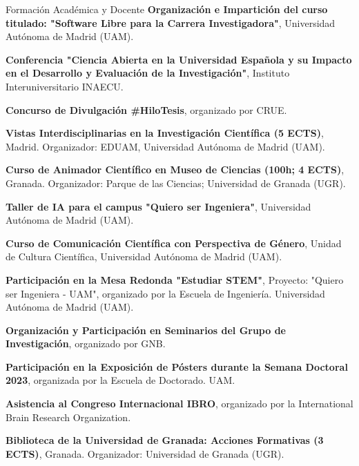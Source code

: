 \begin{rubric}{Formación Académica y Docente}
	\entry*[4 y 11 de marzo de 2024] \textbf{Organización e Impartición del curso titulado: "Software Libre para la Carrera Investigadora"}, Universidad Autónoma de Madrid (UAM).
	
	\entry*[25 de enero de 2023] \textbf{Conferencia "Ciencia Abierta en la Universidad Española y su Impacto en el Desarrollo y Evaluación de la Investigación"}, Instituto Interuniversitario INAECU.
	
	\entry*[Mayo 2021] \textbf{Concurso de Divulgación \#HiloTesis}, organizado por CRUE.
	
	 \textbf{Vistas Interdisciplinarias en la Investigación Científica (5 ECTS)}, Madrid. Organizador: EDUAM, Universidad Autónoma de Madrid (UAM).
	
	 \textbf{Curso de Animador Científico en Museo de Ciencias (100h; 4 ECTS)}, Granada. Organizador: Parque de las Ciencias; Universidad de Granada (UGR).
	
	
	\entry*[Junio 2024] \textbf{Taller de IA para el campus "Quiero ser Ingeniera"}, Universidad Autónoma de Madrid (UAM).
	
	\entry*[Febrero 2024] \textbf{Curso de Comunicación Científica con Perspectiva de Género}, Unidad de Cultura Científica, Universidad Autónoma de Madrid (UAM).
	
	\entry*[Junio 2022] \textbf{Participación en la Mesa Redonda "Estudiar STEM"}, Proyecto: "Quiero ser Ingeniera - UAM", organizado por la Escuela de Ingeniería. Universidad Autónoma de Madrid (UAM).
	
	
	
	 \textbf{Organización y Participación en Seminarios del Grupo de Investigación}, organizado por GNB.
	
	\entry*[Junio 2023] \textbf{Participación en la Exposición de Pósters durante la Semana Doctoral 2023}, organizada por la Escuela de Doctorado. UAM.
	
	\entry*[Septiembre 2023] \textbf{Asistencia al Congreso Internacional IBRO}, organizado por la International Brain Research Organization.
	
	 \textbf{Biblioteca de la Universidad de Granada: Acciones Formativas (3 ECTS)}, Granada. Organizador: Universidad de Granada (UGR).
	
\end{rubric}